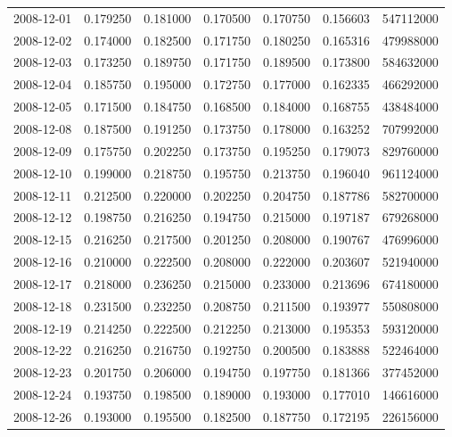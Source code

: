 \begin{tabular}{lrrrrrr}
2008-12-01 &    0.179250 &    0.181000 &    0.170500 &    0.170750 &    0.156603 &   547112000 \\
2008-12-02 &    0.174000 &    0.182500 &    0.171750 &    0.180250 &    0.165316 &   479988000 \\
2008-12-03 &    0.173250 &    0.189750 &    0.171750 &    0.189500 &    0.173800 &   584632000 \\
2008-12-04 &    0.185750 &    0.195000 &    0.172750 &    0.177000 &    0.162335 &   466292000 \\
2008-12-05 &    0.171500 &    0.184750 &    0.168500 &    0.184000 &    0.168755 &   438484000 \\
2008-12-08 &    0.187500 &    0.191250 &    0.173750 &    0.178000 &    0.163252 &   707992000 \\
2008-12-09 &    0.175750 &    0.202250 &    0.173750 &    0.195250 &    0.179073 &   829760000 \\
2008-12-10 &    0.199000 &    0.218750 &    0.195750 &    0.213750 &    0.196040 &   961124000 \\
2008-12-11 &    0.212500 &    0.220000 &    0.202250 &    0.204750 &    0.187786 &   582700000 \\
2008-12-12 &    0.198750 &    0.216250 &    0.194750 &    0.215000 &    0.197187 &   679268000 \\
2008-12-15 &    0.216250 &    0.217500 &    0.201250 &    0.208000 &    0.190767 &   476996000 \\
2008-12-16 &    0.210000 &    0.222500 &    0.208000 &    0.222000 &    0.203607 &   521940000 \\
2008-12-17 &    0.218000 &    0.236250 &    0.215000 &    0.233000 &    0.213696 &   674180000 \\
2008-12-18 &    0.231500 &    0.232250 &    0.208750 &    0.211500 &    0.193977 &   550808000 \\
2008-12-19 &    0.214250 &    0.222500 &    0.212250 &    0.213000 &    0.195353 &   593120000 \\
2008-12-22 &    0.216250 &    0.216750 &    0.192750 &    0.200500 &    0.183888 &   522464000 \\
2008-12-23 &    0.201750 &    0.206000 &    0.194750 &    0.197750 &    0.181366 &   377452000 \\
2008-12-24 &    0.193750 &    0.198500 &    0.189000 &    0.193000 &    0.177010 &   146616000 \\
2008-12-26 &    0.193000 &    0.195500 &    0.182500 &    0.187750 &    0.172195 &   226156000 \\

\end{tabular}
